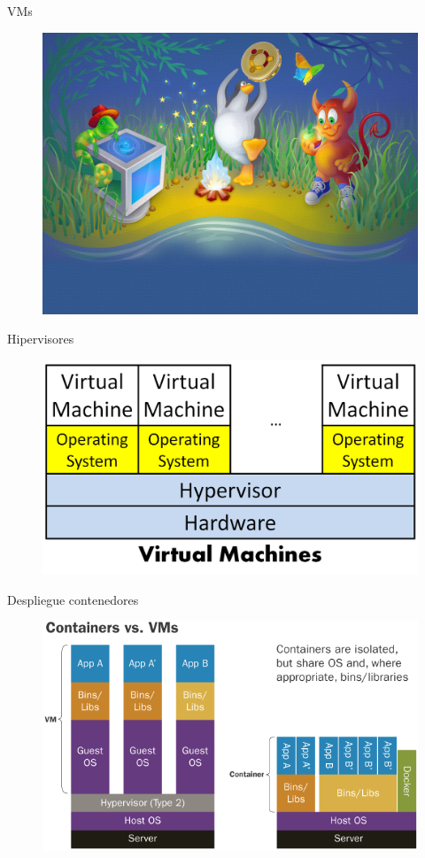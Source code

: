 \documentclass{beamer}
\begin{document}
\begin{frame}{VMs}
\begin{figure}
	\centering
	\includegraphics[width=0.7\linewidth]{Images/virtualbox}
	\label{fig:vm}
\end{figure}
\end{frame}


\begin{frame}{Hipervisores}
\begin{figure}
	\centering
	\includegraphics[width=0.7\linewidth]{Images/hypervisors}
	\label{fig:hypervisors}
\end{figure}
\end{frame}

\begin{frame}{Despliegue contenedores}
\begin{figure}
	\centering
	\includegraphics[width=0.8\linewidth]{Images/containervsvm.png}
	\label{fig:containervsvm}
\end{figure}
\end{frame}
\end{document}
